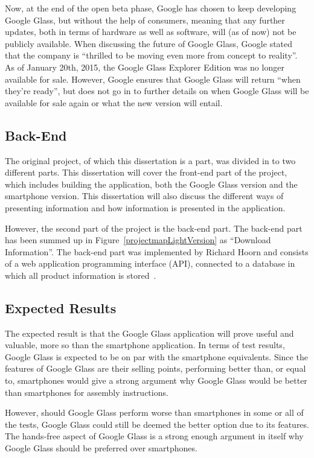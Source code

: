Now, at the end of the open beta phase, Google has chosen to keep developing Google Glass, but without the help of consumers, meaning that any further updates, both in terms of hardware as well as software, will (as of now) not be publicly available. When discussing the future of Google Glass, Google stated that the company is ``thrilled to be moving even more from concept to reality''. As of January 20th, 2015, the Google Glass Explorer Edition was no longer available for sale. However, Google ensures that Google Glass will return ``when they're ready'', but does not go in to further details on when Google Glass will be available for sale again or what the new version will entail. 

\subsection{Back-End}
The original project, of which this dissertation is a part, was divided in to two different parts. This dissertation will cover the front-end part of the project, which includes building the application, both the Google Glass version and the smartphone version. This dissertation will also discuss the different ways of presenting information and how information is presented in the application.

However, the second part of the project is the back-end part. The back-end part has been summed up in Figure~\ref{projectmapLightVersion} as ``Download Information''. The back-end part was implemented by Richard Hoorn and consists of a web application programming interface (API), connected to a database in which all product information is stored~\cite{hoorn}. 

\subsection{Expected Results}
The expected result is that the Google Glass application will prove useful and valuable, more so than the smartphone application. In terms of test results, Google Glass is expected to be on par with the smartphone equivalents. Since the features of Google Glass are their selling points, performing better than, or equal to, smartphones would give a strong argument why Google Glass would be better than smartphones for assembly instructions.

However, should Google Glass perform worse than smartphones in some or all of the tests, Google Glass could still be deemed the better option due to its features. The hands-free aspect of Google Glass is a strong enough argument in itself why Google Glass should be preferred over smartphones. 

